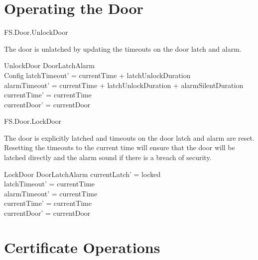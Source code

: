 \section{Operating the Door}

\begin{traceunit}{FS.Door.UnlockDoor}
\end{traceunit}


The door is unlatched by updating the timeouts on the door
latch and alarm. 

\begin{schema}{UnlockDoor}
        \Delta DoorLatchAlarm
\\      Config
\where
        latchTimeout' = currentTime + latchUnlockDuration
\\      alarmTimeout' = currentTime + latchUnlockDuration + alarmSilentDuration
\\      currentTime' = currentTime
\\      currentDoor' = currentDoor
\end{schema}


\begin{traceunit}{FS.Door.LockDoor}
\end{traceunit}

The door is explicitly latched and timeouts on the door
latch and alarm are reset. 
Resetting the timeouts to the current time will ensure that the door
will be latched directly and the alarm sound if there is a breach of security.

\begin{schema}{LockDoor}
        \Delta DoorLatchAlarm
\where
        currentLatch' = locked
\\      latchTimeout' = currentTime
\\      alarmTimeout' = currentTime 
\\      currentTime' = currentTime
\\      currentDoor' = currentDoor
\end{schema}


\section{Certificate Operations}

